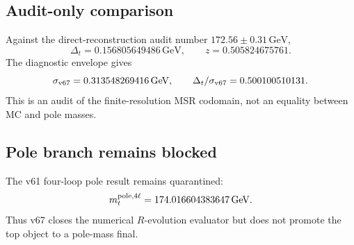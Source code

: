 \subsection{Audit-only comparison}
Against the direct-reconstruction audit number $172.56\pm0.31\,\mathrm{GeV}$,
\[
  \Delta_t=0.156805649486\,\mathrm{GeV},\qquad
  z=0.505824675761.
\]
The diagnostic envelope gives
\[
  \sigma_{\rm v67}=0.313548269416\,\mathrm{GeV},\qquad
  \Delta_t/\sigma_{\rm v67}=0.500100510131.
\]
This is an audit of the finite-resolution MSR codomain, not an equality between MC and pole masses.

\subsection{Pole branch remains blocked}
The v61 four-loop pole result remains quarantined:
\[
  m_t^{\rm pole,4\ell}=174.016604383647\,\mathrm{GeV}.
\]
Thus v67 closes the numerical $R$-evolution evaluator but does not promote the top object to a pole-mass final.

\begin{center}
\end{center}
